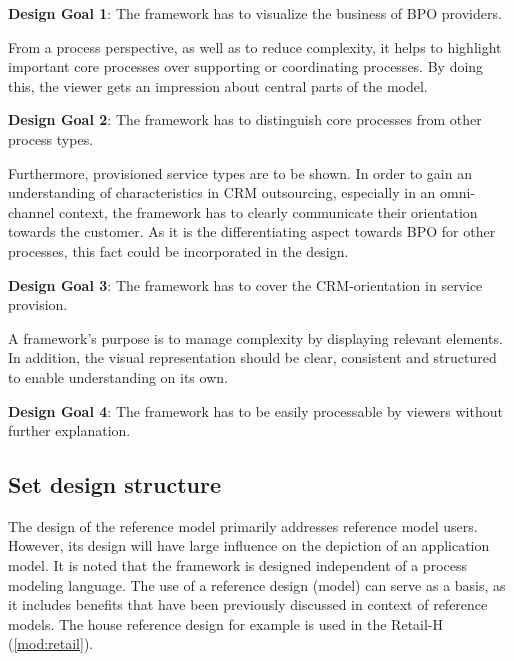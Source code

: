 	\hfill\begin{minipage}{\dimexpr\textwidth-1.2cm}
		\textbf{Design Goal 1}: The framework has to visualize the business of BPO providers.
	\end{minipage}

From a process perspective, as well as to reduce complexity, it helps to highlight important core processes over supporting or coordinating processes. By doing this, the viewer gets an impression about central parts of the model. 

	\hfill\begin{minipage}{\dimexpr\textwidth-1.2cm}
	\textbf{Design Goal 2}: The framework has to distinguish core processes from other process types. 
\end{minipage}

Furthermore, provisioned service types are to be shown. In order to gain an understanding of characteristics in CRM outsourcing, especially in an omni-channel context, the framework has to clearly communicate their orientation towards the customer. As it is the differentiating aspect towards BPO for other processes, this fact could be incorporated in the design.  

	\hfill\begin{minipage}{\dimexpr\textwidth-1.2cm}
	\textbf{Design Goal 3}: The framework has to cover the CRM-orientation in service provision. 
\end{minipage}

A framework's purpose is to manage complexity by displaying relevant elements. In addition, the visual representation should be clear, consistent and structured to enable understanding on its own. 

	\hfill\begin{minipage}{\dimexpr\textwidth-1.2cm}
	\textbf{Design Goal 4}: The framework has to be easily processable by viewers without further explanation. 
\end{minipage}

	\subsection{Set design structure}
	
	The design of the reference model primarily addresses reference model users. However, its design will have large influence on the depiction of an application model. It is noted that the framework is designed independent of a process modeling language. The use of a reference design (model) can serve as a basis, as it includes benefits that have been previously discussed in context of reference models. The house reference design for example is used in the Retail-H (\ref{mod:retail}).
	

